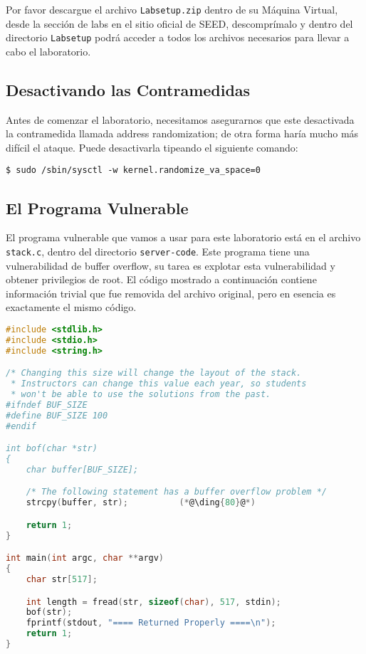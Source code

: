 Por favor descargue el archivo \texttt{Labsetup.zip} dentro de su Máquina Virtual, desde la sección de labs en el sitio oficial de SEED, descomprímalo y dentro del directorio \texttt{Labsetup} podrá acceder a todos los archivos necesarios para llevar a cabo el laboratorio.


\subsection{Desactivando las Contramedidas} 

Antes de comenzar el laboratorio, necesitamos asegurarnos que este desactivada la contramedida llamada address randomization; de otra forma haría mucho más difícil el ataque.
Puede desactivarla tipeando el siguiente comando:

\begin{lstlisting}
$ sudo /sbin/sysctl -w kernel.randomize_va_space=0
\end{lstlisting}
 

\subsection{El Programa Vulnerable} 
\label{sec:vulnerable_program}

El programa vulnerable que vamos a usar para este laboratorio está en el archivo \texttt{stack.c}, dentro del directorio \texttt{server-code}. Este programa tiene una vulnerabilidad de buffer overflow, su tarea es explotar esta vulnerabilidad y obtener privilegios de root. El código mostrado a continuación contiene información trivial que fue removida del archivo original, pero en esencia es exactamente el mismo código.

\begin{lstlisting}[language=C, caption={\texttt{stack.c}}]
#include <stdlib.h>
#include <stdio.h>
#include <string.h>

/* Changing this size will change the layout of the stack.
 * Instructors can change this value each year, so students
 * won't be able to use the solutions from the past.
#ifndef BUF_SIZE
#define BUF_SIZE 100
#endif

int bof(char *str)
{
    char buffer[BUF_SIZE];

    /* The following statement has a buffer overflow problem */ 
    strcpy(buffer, str);          (*@\ding{80}@*)

    return 1;
}

int main(int argc, char **argv)
{
    char str[517];

    int length = fread(str, sizeof(char), 517, stdin);
    bof(str);
    fprintf(stdout, "==== Returned Properly ====\n");
    return 1;
}
\end{lstlisting}

